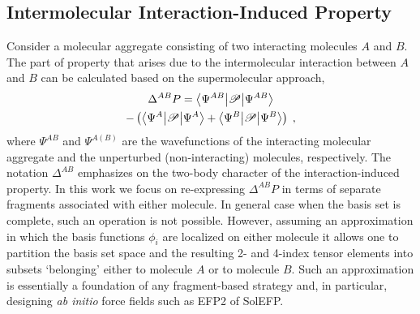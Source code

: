 


\subsection{\label{ss:2.1}Intermolecular Interaction-Induced Property}

Consider a molecular aggregate consisting of two interacting 
molecules $A$ and $B$. The part of property that arises due to the
intermolecular interaction between $A$ and $B$ can be calculated
based on the supermolecular approach,
%
\begin{multline} \label{e:delta-p}
	\Delta^{AB} P = \bigl\langle {\Psi^{AB}} \bigl\lvert {\mathscr{P}} \bigl\lvert {\Psi^{AB}} \bigr\rangle \\- 
	\left(
	    \bigl\langle {\Psi^{A}} \bigl\lvert {\mathscr{P}} \bigl\lvert {\Psi^{A}} \bigr\rangle +
	    \bigl\langle {\Psi^{B}} \bigl\lvert {\mathscr{P}} \bigl\lvert {\Psi^{B}} \bigr\rangle
	\right)
	\;,
\end{multline}
%
where $\Psi^{AB}$ and $\Psi^{A(B)}$ are the wavefunctions of the interacting molecular aggregate
and the unperturbed (non\hyp{}interacting) molecules, respectively.
The notation $\Delta^{AB}$ emphasizes on the two\hyp{}body character of the interaction\hyp{}induced
property. In this work we focus on re\hyp{}expressing $\Delta^{AB}P$ in terms of separate
fragments associated with either molecule. In general case when the basis set
is complete, such an operation is not possible. However,
assuming an approximation
in which the basis functions $\phi_i$ 
are localized on either molecule it allows one to partition the basis set space
and the resulting 2\hyp{} and 4\hyp{}index tensor elements
into subsets `belonging' either to molecule $A$ or to molecule $B$.
Such an approximation is essentially a foundation of any fragment\hyp{}based strategy
and, in particular, designing \emph{ab initio} force fields such as EFP2
of SolEFP.

